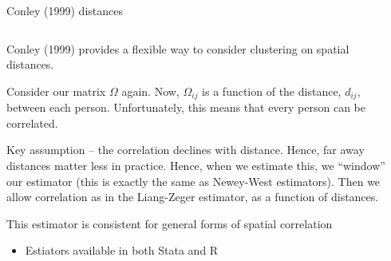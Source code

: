 \documentclass[notes,11pt, aspectratio=169]{beamer}
\newenvironment{wideitemize}{\itemize\addtolength{\itemsep}{10pt}}{\enditemize}
\begin{document}
\begin{frame}{Conley (1999) distances}
\begin{columns}[T] %
\begin{column}{.8\textwidth}
  \begin{wideitemize}
  \item Conley (1999) provides a flexible way to consider clustering on spatial distances.
  \item Consider our matrix $\Omega$ again. Now, $\Omega_{ij}$ is a
    function of the distance, $d_{ij}$, between each
    person. Unfortunately, this means that every person can be
    correlated.
  \item Key assumption -- the correlation declines with
    distance. Hence, far away distances matter less in
    practice. Hence, when we estimate this, we ``window'' our
    estimator (this is exactly the same as Newey-West
    estimators). Then we allow correlation as in the Liang-Zeger
    estimator, as a function of distances.
  \item This estimator is consistent for general forms of spatial
    correlation
    \begin{itemize}
    \item Estiators available in both Stata and R
    \end{itemize}
  \end{wideitemize}
  \end{column}%
  \hfill%
  \begin{column}{.5\textwidth}
  \end{column}
\end{columns}
  
\end{frame}
\end{document}
